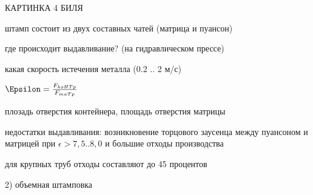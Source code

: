 {\begin{center}
    \par КАРТИНКА 4 БИЛЯ

    \par штамп состоит из двух составных чатей (матрица и пуансон)

    \par где происходит выдавливание? (на гидравлическом прессе)

    \par какая скорость истечения металла (0.2 .. 2 м/с)

    \par $\Epsilon = \frac{F_{koHTp}}{F_{maTp}}$

    \par плозадь отверстия контейнера, площадь отверстия матрицы

    \par недостатки выдавливания: возникновение торцового заусенца между пуансоном и матрицей при $\epsilon > 7,5..8,0$ и большие отходы производства

    \par для крупных труб отходы составляют до 45 процентов

    \par 2) объемная штамповка

    \par 

    \par 

    \par 

    \par 

    \par 

    \par 

    \par 

    \par 
    
    \par 

    \par 

    \par 

    \par 

    \par 

    \par 

    \par 


\end{center}}
